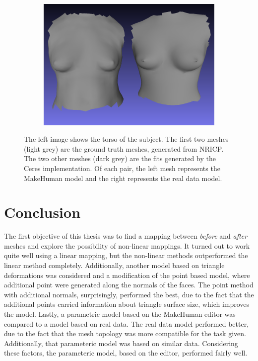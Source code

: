 \begin{figure}
\begin{subfigure}{.38\textwidth}
  \centering
  \includegraphics[width=1\linewidth]{figures/before57_cropped}
\end{subfigure}
\caption[Comparison image, fitted and ICP]{The left image shows the torso of the subject. The first two meshes (light grey) are the ground truth meshes, generated from NRICP. The two other meshes (dark grey) are the fits generated by the Ceres implementation. Of each pair, the left mesh represents the MakeHuman model and the right represents the real data model.}
\label{fig:compimagefiticp}
\end{figure}

\chapter{Conclusion}
The first objective of this thesis was to find a mapping between \textit{before} and \textit{after} meshes and explore the possibility of non-linear mappings. It turned out to work quite well using a linear mapping, but the non-linear methods outperformed the linear method completely. Additionally, another model based on triangle deformations was considered and a modification of the point based model, where additional point were generated along the normals of the faces. The point method with additional normals, surprisingly, performed the best, due to the fact that the additional points carried information about triangle surface size, which improves the model. Lastly, a parametric model based on the MakeHuman editor was compared to a model based on real data. The real data model performed better, due to the fact that the mesh topology was more compatible for the task given. Additionally, that parameteric model was based on similar data. Considering these factors, the parameteric model, based on the editor, performed fairly well.

